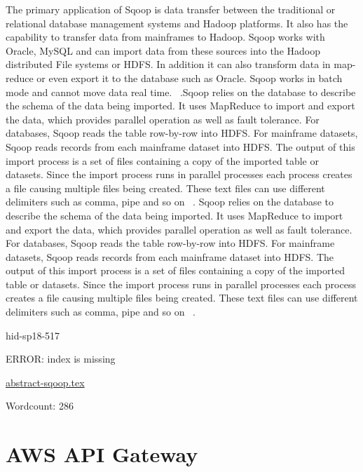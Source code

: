 The primary application of Sqoop is data transfer between the 
traditional or relational database management systems and 
Hadoop platforms. It also has the capability to transfer data 
from mainframes to Hadoop. Sqoop works with Oracle, MySQL and
can import data from these sources into the Hadoop distributed 
File systems or HDFS. In addition it can also transform data in 
map-reduce or even export it to the database such as Oracle.
Sqoop works in batch mode and cannot move data real time.
~\cite{hid-sp18-517-Sqoop}.Sqoop relies on the database to describe
the schema of the
data being imported. It uses MapReduce to import and export the data, 
which provides parallel operation as well as fault tolerance. 
For databases, Sqoop reads the table row-by-row into HDFS. 
For mainframe datasets, Sqoop reads records from each mainframe 
dataset into HDFS. The output of this import process is a set of 
files containing a copy of the imported table or datasets. Since 
the import process runs in parallel processes each process 
creates a file causing multiple files being created. These text 
files can use different delimiters such as comma, pipe and so on 
~\cite{hid-sp18-517-Sqoop}. Sqoop relies on the database to describe
the schema of the data being imported. It uses MapReduce to import and
export the data, 
which provides parallel operation as well as fault tolerance. 
For databases, Sqoop reads the table row-by-row into HDFS. 
For mainframe datasets, Sqoop reads records from each mainframe 
dataset into HDFS. The output of this import process is a set of 
files containing a copy of the imported table or datasets. Since 
the import process runs in parallel processes each process 
creates a file causing multiple files being created. These text 
files can use different delimiters such as comma, pipe and so on 
~\cite{hid-sp18-517-Sqoop}.




\begin{IU}

hid-sp18-517

ERROR: index is missing

\href{https://github.com/cloudmesh-community/hid-sp18-517/blob/master//technology/abstract-sqoop.tex}{abstract-sqoop.tex}

 

Wordcount: 286

\end{IU}

\section{AWS API Gateway}

